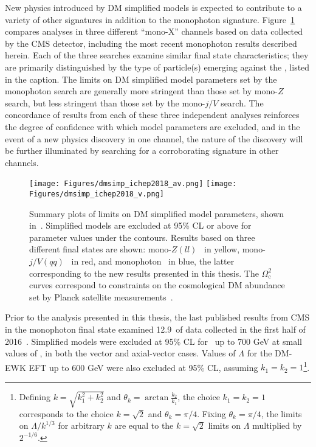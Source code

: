New physics introduced by DM simplified models is expected to contribute to a variety of other signatures in addition to the monophoton signature. Figure~\ref{fig:dmsimp_ichep2018} compares
analyses in three different ``mono-X'' channels based on data collected by the CMS detector, including the most recent monophoton results described herein. Each of the three
searches examine similar final state characteristics; they are primarily distinguished by the type of particle(s) emerging against the \vecMET, listed in the caption.
The limits on DM simplified model parameters set by the monophoton search are generally more stringent than those set by mono-$Z$ search, but less stringent
than those set by the mono-$j/V$ search. The concordance of results from each of these three independent analyses reinforces the degree of confidence with which model
parameters are excluded, and in the event of a new physics discovery in one channel, the nature of the discovery will be further illuminated by searching for a corroborating
signature in other channels.

\begin{figure}[hbtb]
  \begin{center}
    \texttt{[image: Figures/dmsimp\_ichep2018\_av.png]}
    \texttt{[image: Figures/dmsimp\_ichep2018\_v.png]}
    \caption{Summary plots of limits on DM simplified model parameters, shown in~\cite{ref:dmsummaryplots_ichep2018}. Simplified models are excluded at 95\% CL or above
    for parameter values under the contours.
    Results based on three different final states are shown: mono-$Z(ll)$~\cite{ref:epjc/s10052-018-5740-1} in yellow, mono-$j/V(qq)$~\cite{ref:PhysRevD.97.092005} in red, and monophoton~\cite{ref:1810.00196} in blue,
    the latter corresponding to the new results presented in this thesis. The $\Omega_\mathrm{c}^{2}$ curves correspond to constraints on the cosmological DM abundance set by Planck satellite measurements~\cite{ref:planck2018_cosparams}.}
    \label{fig:dmsimp_ichep2018}
  \end{center}
\end{figure}

Prior to the analysis presented in this thesis, the last published results from CMS in the monophoton final state examined 12.9\fbinv\ of data collected in the first half
of 2016~\cite{ref:JHEP10(2017)073}. Simplified models were excluded at 95\% CL for \mmed\ up to 700 GeV at small values of \mdm, in both the vector
and axial-vector cases. Values of $\Lambda$ for the DM-EWK EFT up to 600 GeV were also excluded at 95\% CL, assuming $k_{1} = k_{2} = 1$\footnote{Defining $k = \sqrt{k_{1}^{2} + k_{2}^{2}}$
and $\theta_{k} = \arctan{\frac{k_{2}}{k_{1}}}$, the choice $k_{1} = k_{2} = 1$ corresponds to the choice $k = \sqrt{2}$ and $\theta_{k} = \pi/4$. Fixing $\theta_{k} = \pi/4$,
the limits on $\Lambda / k^{1/3}$ for arbitrary $k$ are equal to the $k = \sqrt{2}$ limits on $\Lambda$ multiplied by $2^{-1/6}$.}.

